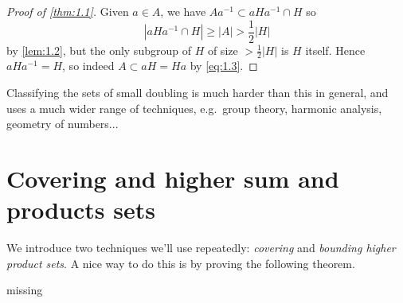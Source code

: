 \documentclass{article}
\numberwithin{equation}{section}
\begin{document}
\begin{proof}[Proof of \cref{thm:1.1}]
  Given $a \in A$, we have $A a^{-1} \subset a H a^{-1} \cap H$ so
  \begin{equation*}|a H a^{-1} \cap H| \geq |A| > \frac{1}{2} |H|\end{equation*}
  by \cref{lem:1.2}, but the only subgroup of $H$ of size $> \frac{1}{2}|H|$ is $H$ itself.
  Hence $a H a^{-1} = H$, so indeed $A \subset a H = Ha$ by \eqref{eq:1.3}.
\end{proof}
Classifying the sets of small doubling is much harder than this in general, and uses a much wider range of techniques, e.g.\ group theory, harmonic analysis, geometry of numbers...

\section{Covering and higher sum and products sets}
We introduce two techniques we'll use repeatedly: \emph{covering} and \emph{bounding higher product sets}. A nice way to do this is by proving the following theorem.
\begin{nthm}[Rusza]\label{thm:2.1}
  missing %
\end{nthm}
\end{document}
